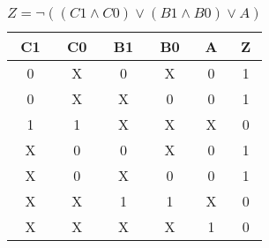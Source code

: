 
\begin{center}
    \begin{table}[h] \caption{\(Z = \lnot ((C1 \land C0) \lor (B1 \land B0) \lor A) \)}
        \begin{center}
            \begin{tabular}{|c|c|c|c|c||c|} \hline
            C1 & C0 & B1 & B0 & A & Z \\ \hline\hline
            0  & X  & 0  & X  & 0 & 1 \\ \hline
            0  & X  & X  & 0  & 0 & 1 \\ \hline
            1  & 1  & X  & X  & X & 0 \\ \hline
            X  & 0  & 0  & X  & 0 & 1 \\ \hline
            X  & 0  & X  & 0  & 0 & 1 \\ \hline
            X  & X  & 1  & 1  & X & 0 \\ \hline
            X  & X  & X  & X  & 1 & 0 \\ \hline
            \end{tabular}
        \end{center}
    \end{table}
\end{center}

